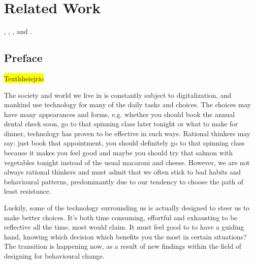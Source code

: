 \chapter{Related Work}

\cite{acquisti_nudges_2017}, \cite{al_stairs_nodate} \cite{suri_stairs_2014}, \cite{fogg_persuasive_2003}, and \cite{hamper_behavior_2016}.


\cite{karl_chapter_nodate}

\section*{Preface}

\colorbox{yellow}{Texthheiejrio}

The society and world we live in is constantly subject to digitalization, and mankind use technology for many of the daily tasks and choices. The choices may have many appearances and forms, e.g. whether you should book the annual dental check soon, go to that spinning class later tonight or what to make for dinner, technology has proven to be effective in such ways. Rational thinkers may say: just book that appointment, you should definitely go to that spinning class because it makes you feel good and maybe you should try that salmon with vegetables tonight instead of the usual macaroni and cheese. However, we are not always rational thinkers and must admit that we often stick to bad habits and behavioural patterns, predominantly due to our tendency to choose the path of least resistance. 

Luckily, some of the technology surrounding us is actually designed to steer us to make better choices. It’s both time consuming, effortful and exhausting to be reflective all the time, most would claim. It must feel good to to have a guiding hand, knowing which decision which benefits you the most in certain situations? The transition is happening now, as a result of new findings within the field of designing for behavioural change. 

